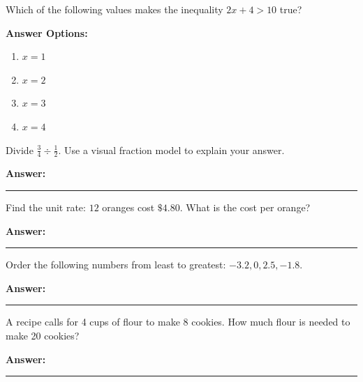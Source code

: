 \documentclass[12pt]{article}
\begin{document}
\begin{tcolorbox}[colframe=black!50, colback=white, title=\textbf{Problem 4}]
Which of the following values makes the inequality \(2x + 4 > 10\) true?

\textbf{Answer Options:}
\begin{enumerate}[label=(\Alph*), itemsep=0.5cm]
    \item \(x = 1\)
    \item \(x = 2\)
    \item \(x = 3\)
    \item \(x = 4\)
\end{enumerate}
\vspace{1cm}
\end{tcolorbox}

\begin{tcolorbox}[colframe=black!50, colback=white, title=\textbf{Problem 5}]
Divide \(\frac{3}{4} \div \frac{1}{2}\). Use a visual fraction model to explain your answer.

\vspace{3cm}
\textbf{Answer:} \rule{0.5\textwidth}{0.4mm}
\end{tcolorbox}

\begin{tcolorbox}[colframe=black!50, colback=white, title=\textbf{Problem 6}]
Find the unit rate: \(12\) oranges cost \(\$4.80\). What is the cost per orange?

\vspace{2cm}
\textbf{Answer:} \rule{0.5\textwidth}{0.4mm}
\end{tcolorbox}

\begin{tcolorbox}[colframe=black!50, colback=white, title=\textbf{Problem 7}]
Order the following numbers from least to greatest: \(-3.2, 0, 2.5, -1.8\).

\vspace{2cm}
\textbf{Answer:} \rule{0.5\textwidth}{0.4mm}
\end{tcolorbox}

\begin{tcolorbox}[colframe=black!50, colback=white, title=\textbf{Problem 8}]
A recipe calls for 4 cups of flour to make 8 cookies. How much flour is needed to make 20 cookies?

\vspace{2.5cm}
\textbf{Answer:} \rule{0.5\textwidth}{0.4mm}
\end{tcolorbox}
\end{document}
